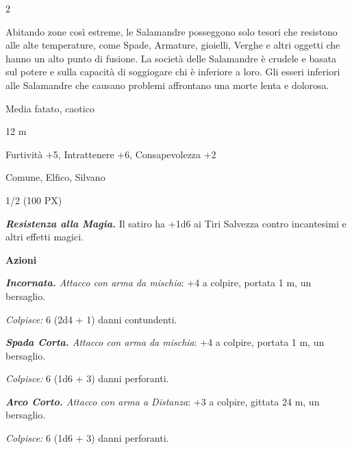 \begin{multicols}{2}
{Abitando zone così estreme, le Salamandre posseggono solo tesori che resistono alle alte temperature, come Spade, Armature, gioielli, Verghe e altri oggetti che hanno un alto punto di fusione. La società delle Salamandre è crudele e basata sul potere e sulla capacità di soggiogare chi è inferiore a loro. Gli esseri inferiori alle Salamandre che causano problemi affrontano una morte lenta e dolorosa.

\begin{description}[noitemsep, topsep=0pt, parsep=0pt, partopsep=0pt, itemsep=1pt, leftmargin=2.35cm,  labelwidth=2.2cm, itemindent=0cm, listparindent=0pt] %
\setlength{\baselineskip}{10pt}
\item[\textbf{Taglia/Tipo}] Media fatato, caotico
\item[\textbf{Caratt.}] 
\item[\textbf{Punti Ferita}] 
\item[\textbf{Movimento}] 12 m
\item[\textbf{Tiri Salvez.}] 
\item[\textbf{Comp.}] Furtività +5, Intrattenere +6, Consapevolezza +2
\item[\textbf{Linguaggi}] Comune, Elfico, Silvano
\item[\textbf{Sfida}] 1/2 (100 PX)
\end{description}
\smallskip

\emph{\textbf{Resistenza alla Magia.}} Il satiro ha +1d6 ai Tiri Salvezza contro incantesimi e altri effetti magici.

\textbf{Azioni}

\emph{\textbf{Incornata.} Attacco con arma da mischia}: +4 a colpire, portata 1 m, un bersaglio.

\emph{Colpisce:} 6 (2d4 + 1) danni contundenti.

\emph{\textbf{Spada Corta.} Attacco con arma da mischia}: +4 a colpire, portata 1 m, un bersaglio.

\emph{Colpisce:} 6 (1d6 + 3) danni perforanti.

\emph{\textbf{Arco Corto.} Attacco con arma a Distanza}: +3 a colpire, gittata 24 m, un bersaglio.

\emph{Colpisce:} 6 (1d6 + 3) danni perforanti.

}
\end{multicols}
